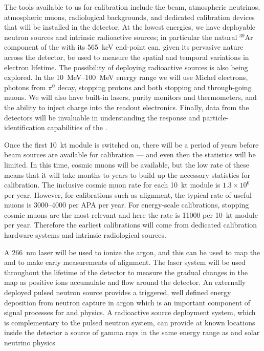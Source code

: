 The tools available to us for calibration include the  beam, atmospheric neutrinos, atmospheric muons, radiological backgrounds, and dedicated calibration devices that will be installed in the detector. At the lowest energies, we have deployable neutron sources and intrinsic radioactive sources; in particular the natural $^{39}$Ar component of the  with its \SI{565}{\kilo\electronvolt} end-point can, given its pervasive nature across the detector, be used to measure the spatial and temporal variations in electron lifetime. The possibility of deploying radioactive sources is also being explored. In the \SIrange{10}{100}{\mega\electronvolt} energy range we will use Michel electrons, photons from $\pi^{0}$ decay, stopping protons and both stopping and through-going muons. We will also have built-in lasers, purity monitors and thermometers, and the ability to inject charge into the readout electronics. Finally, data from the  detectors will be invaluable in understanding the response and particle-identification capabilities of the .

Once the first \SI{10}{\kilo\tonne} module is switched on, there will be a period of years before  beam sources are available for calibration --- and even then the statistics will be limited. In this time, cosmic muons will be available, but the low rate of these means that it will take months to years to build up the necessary statistics for calibration. The inclusive cosmic muon rate for each \SI{10}{\kilo\tonne} module is $1.3\times 10^{6}$ per year. However, for calibrations such as  alignment, the typical rate of useful muons is 3000--4000 per APA per year. For energy-scale calibrations, stopping cosmic muons are the most relevant and here the rate is 11000 per \SI{10}{\kilo\tonne} module per year. Therefore the earliest calibrations will come from dedicated calibration hardware systems and intrinsic radiological sources.

A \SI{266}{\nano\meter} laser will be used to ionize the argon, and this can be used to map the \efield and to make early measurements of  alignment. The laser system will be used throughout the lifetime of the detector to measure the gradual changes in the \efield map as positive ions accumulate and flow around the detector.
An externally deployed pulsed neutron source provides a triggered, well defined energy deposition from neutron capture in argon which is an important component of signal processes for  and  physics. A radioactive source deployment system, which is complementary to the pulsed neutron system, can provide at known locations inside the detector a source of gamma rays in the same energy range as  and solar neutrino physics

